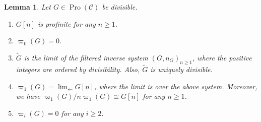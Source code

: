 \documentclass[11pt]{article}
\newtheorem{lemm}[theo]{Lemma}
\theoremstyle{definition}
\numberwithin{equation}{section}
\newcommand\cC{{\mathcal C}}
\newcommand\tG{{\widetilde G}}
\DeclareMathOperator{\Pro}{Pro}
\theoremstyle{remark}
\newcommand*{\romanenumi}{}%
\begin{document}
\begin{lemm}\label{lem:divisible}
Let $G \in \Pro(\cC)$ be divisible.
\begin{enumerate}\romanenumi
\item \label{3.4.1} $G[n]$ is profinite for any $n \geq 1$.
\item \label{3.4.2} $\varpi_0(G) = 0$.
\item \label{3.4.3} $\tG$ is the limit of the filtered inverse system $(G,n_G)_{n \geq 1}$, where the positive integers are ordered by divisibility. Also, $\tG$ is uniquely divisible.
\item \label{3.4.4} $\varpi_1(G) = \lim_{\leftarrow} G[n]$, where the limit is over the above system. Moreover, we have $\varpi_1(G)/n \varpi_1(G) \cong G[n]$ for any $n \geq 1$.
\item \label{3.4.5} $\varpi_i(G) = 0$ for any $i \geq 2$.
\end{enumerate}
\end{lemm}
\end{document}
